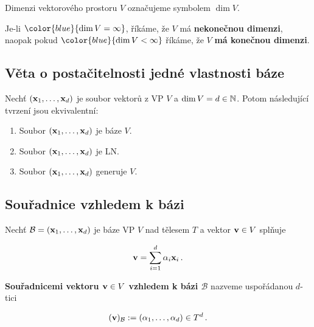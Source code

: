 \noindent Dimenzi vektorového prostoru $V$ označujeme symbolem $\dim V$.

\noindent Je-li $\color{blue}{\dim V = \infty}$, říkáme, že $V$ má \textbf{nekonečnou
      dimenzi}, naopak pokud $\color{blue}{\dim V < \infty}$ říkáme, že $V$
\textbf{má konečnou dimenzi}.

\subsection*{Věta o postačitelnosti jedné vlastnosti báze}

Nechť $(\mathbf{x}_1,\dots,\mathbf{x}_d)$ je soubor vektorů z VP $V$ a $\dim V=d\in\mathbb{N}$. Potom
následující tvrzení jsou ekvivalentní:

\begin{enumerate}
      \item Soubor $(\mathbf{x}_1,\dots,\mathbf{x}_d)$ je báze $V$.
      \item Soubor $(\mathbf{x}_1,\dots,\mathbf{x}_d)$ je LN.
      \item Soubor $(\mathbf{x}_1,\dots,\mathbf{x}_d)$ generuje $V$.
\end{enumerate}

\subsection*{Souřadnice vzhledem k bázi}

Nechť $\mathcal B=(\mathbf{x}_1,\dots,\mathbf{x}_d)$ je báze VP $V$ nad tělesem $T$ a vektor
$\mathbf{v}\in V$ splňuje

\[ \mathbf{v}=\sum_{i=1}^{d}\alpha_{i}\mathbf{x}_{i}\,. \]

\textbf{Souřadnicemi vektoru $\mathbf{v}\in V$ vzhledem k bázi $\mathcal B$} nazveme uspořádanou $d$-tici

\[ (\mathbf{v})_\mathcal B:=(\alpha_1,\dots,\alpha_d)\in T^{d}\,. \]

\pagebreak